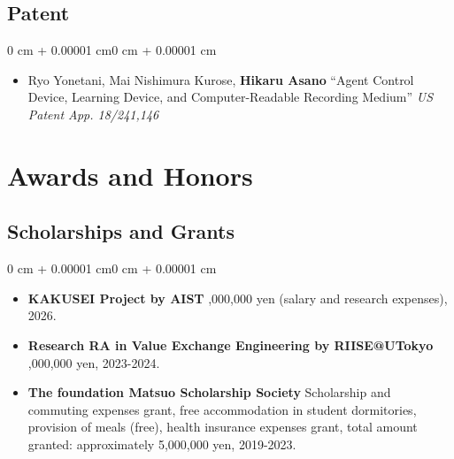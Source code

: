 \documentclass[10pt, letterpaper]{article}
\newenvironment{highlights}{
    \begin{itemize}[
        topsep=0.10 cm,
        parsep=0.10 cm,
        partopsep=0pt,
        itemsep=0pt,
        leftmargin=0 cm + 10pt
    ]
}{
    \end{itemize}
}
\newenvironment{onecolentry}{
    \begin{adjustwidth}{0 cm + 0.00001 cm}{0 cm + 0.00001 cm}
}{
    \end{adjustwidth}
}
\begin{document}
    \subsection{Patent}
    
        \begin{onecolentry}
            \begin{highlights}
                \item Ryo Yonetani, Mai Nishimura Kurose, \textbf{Hikaru Asano} \newline
                ``Agent Control Device, Learning Device, and Computer-Readable Recording Medium'' \newline
                \textit{US Patent App. 18/241,146}
    
            \end{highlights}
        \end{onecolentry}

    \section{Awards and Honors}
    
    \subsection{Scholarships and Grants}
        \begin{onecolentry}
            \begin{highlights}
                \item \textbf{KAKUSEI Project by AIST} ,000,000 yen (salary and research expenses), 2026.
    
                \item \textbf{Research RA in Value Exchange Engineering by RIISE@UTokyo} ,000,000 yen, 2023-2024.
    
                \item \textbf{The foundation Matsuo Scholarship Society} \newline
                Scholarship and commuting expenses grant, free accommodation in student dormitories, provision of meals (free), health insurance expenses grant, total amount granted: approximately 5,000,000 yen, 2019-2023.
    
            \end{highlights}
        \end{onecolentry}
    
\end{document}
